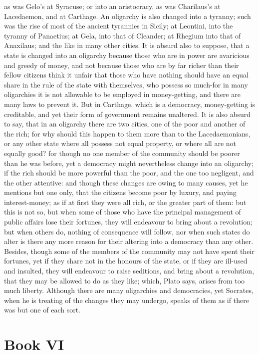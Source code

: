 \documentclass[12pt]{article}
\begin{document}
as was Gelo's at Syracuse; or into an aristocracy, as was Charilaus's at Lacedaemon, and at Carthage. An oligarchy is also changed into a tyranny; such was the rise of most of the ancient tyrannies in Sicily; at Leontini, into the tyranny of Panaetius; at Gela, into that of Cleander; at Rhegium into that of Anaxilaus; and the like in many other cities. It is absurd also to suppose, that a state is changed into an oligarchy because those who are in power are avaricious and greedy of money, and not because those who are by far richer than their fellow citizens think it unfair that those who have nothing should have an equal share in the rule of the state with themselves, who possess so much-for in many oligarchies it is not allowable to be employed in money-getting, and there are many laws to prevent it. But in Carthage, which is a democracy, money-getting is creditable, and yet their form of government remains unaltered. It is also absurd to say, that in an oligarchy there are two cities, one of the poor and another of the rich; for why should this happen to them more than to the Lacedaemonians, or any other state where all possess not equal property, or where all are not equally good? for though no one member of the community should be poorer than he was before, yet a democracy might nevertheless change into an oligarchy; if the rich should be more powerful than the poor, and the one too negligent, and the other attentive: and though these changes are owing to many causes, yet he mentions but one only, that the citizens become poor by luxury, and paying interest-money; as if at first they were all rich, or the greater part of them: but this is not so, but when some of those who have the principal management of public affairs lose their fortunes, they will endeavour to bring about a revolution; but when others do, nothing of consequence will follow, nor when such states do alter is there any more reason for their altering into a democracy than any other. Besides, though some of the members of the community may not have spent their fortunes, yet if they share not in the honours of the state, or if they are ill-used and insulted, they will endeavour to raise seditions, and bring about a revolution, that they may be allowed to do as they like; which, Plato says, arises from too much liberty. Although there are many oligarchies and democracies, yet Socrates, when he is treating of the changes they may undergo, speaks of them as if there was but one of each sort.

\section*{Book VI}
\end{document}
